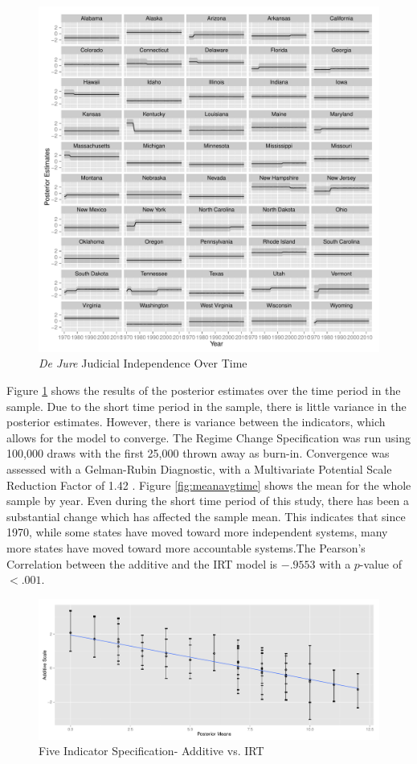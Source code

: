 \documentclass[12pt]{article}
\begin{document}
\begin{figure}
	\centering\caption{\textit{De Jure} Judicial Independence Over Time}
	\label{fig:fiveind_timeplot}
	\includegraphics[scale=.8]{graphics/fiveind/fiveind_timeplot}
\end{figure}

Figure \ref{fig:fiveind_timeplot} shows the results of the posterior estimates over the time period in the sample.  Due to the short time period in the sample, there is little variance in the posterior estimates.  However, there is variance between the indicators, which allows for the model to converge.  The Regime Change Specification was run using 100,000 draws with the first 25,000 thrown away as burn-in.  Convergence was assessed with a Gelman-Rubin Diagnostic, with a Multivariate Potential Scale Reduction Factor of 1.42 \citep{Gelman1992}.  Figure \ref{fig:meanavgtime} shows the mean for the whole sample by year.  Even during the short time period of this study, there has been a substantial change which has affected the sample mean.  This indicates that since 1970, while some states have moved toward more independent systems, many more states have moved toward more accountable systems.The Pearson's Correlation between the additive and the IRT model is $-.9553$ with a $p$-value of $<.001$.

\begin{figure}
	\centering
	\caption{Five Indicator Specification- Additive vs. IRT}
	\label{fig:fiveind_additive_ggplot}
	\includegraphics[width=0.7\linewidth]{graphics/fiveind/fiveind_additive_ggplot}
\end{figure}
\end{document}
